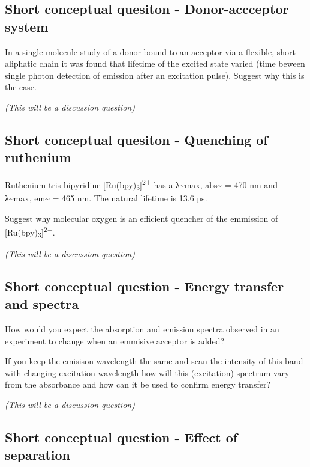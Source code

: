 \documentclass[
]{book}
\begin{document}
\hypertarget{sec:donoracceptor}{%
\subsection{Short conceptual quesiton - Donor-accceptor system}\label{sec:donoracceptor}}

In a single molecule study of a donor bound to an acceptor via a flexible, short aliphatic chain it was found that lifetime of the excited state varied (time beween single photon detection of emission after an excitation pulse). Suggest why this is the case.

\emph{(This will be a discussion question)}

\hypertarget{sec:ruquench}{%
\subsection{Short conceptual quesiton - Quenching of ruthenium}\label{sec:ruquench}}

Ruthenium tris bipyridine {[}Ru(bpy)\textsubscript{3}{]}\textsuperscript{2+} has a λ\textasciitilde max, abs\textasciitilde{} = 470 nm and λ\textasciitilde max, em\textasciitilde{} = 465 nm. The natural lifetime is 13.6 µs.

Suggest why molecular oxygen is an efficient quencher of the emmission of {[}Ru(bpy)\textsubscript{3}{]}\textsuperscript{2+}.

\emph{(This will be a discussion question)}

\hypertarget{sec:spectra}{%
\subsection{Short conceptual question - Energy transfer and spectra}\label{sec:spectra}}

How would you expect the absorption and emission spectra observed in an experiment to change when an emmisive acceptor is added?

If you keep the emisison wavelength the same and scan the intensity of this band with changing excitation wavelength how will this (excitation) spectrum vary from the absorbance and how can it be used to confirm energy transfer?

\emph{(This will be a discussion question)}

\hypertarget{sec:FRETDNA}{%
\subsection{Short conceptual question - Effect of separation}\label{sec:FRETDNA}}
\end{document}
